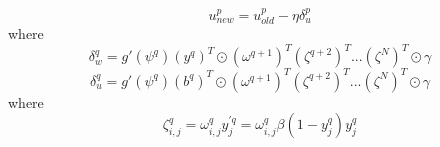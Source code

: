 \documentclass{article}
\begin{document}
%
\begin{equation} \label{eq:u_weights}
u_{new}^p = u_{old}^p - \eta \delta_u^p
\end{equation}
%
where
%
\begin{equation} \label{eq:w_delta}
\delta_w^{q} = g'(\psi^{q}) (y^{q})^T \odot (\omega^{q+1})^T (\zeta^{q+2})^T ... (\zeta^N)^T \odot \gamma
\end{equation}
%
\begin{equation} \label{eq:u_delta}
\delta_u^{q} = g'(\psi^{q}) (b^{q})^T \odot (\omega^{q+1})^T (\zeta^{q+2})^T ... (\zeta^N)^T \odot \gamma
\end{equation}
%
where
%
\begin{equation} \label{eq:u_delta}
\zeta_{i,j}^q = \omega_{i,j}^q y_j^{\prime q} = \omega_{i,j}^q \beta (1 - y_j^q) y_j^q
\end{equation}
%
\end{document}
